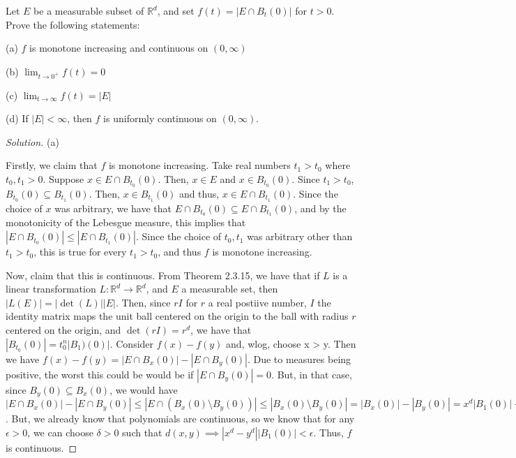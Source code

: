 \documentclass[10pt]{article}
\newenvironment{problem}[2][Problem]{\begin{trivlist}
\item[\hskip \labelsep {\bfseries #1}\hskip \labelsep {\bfseries #2.}]}{\end{trivlist}}
\begin{document}
\begin{problem}{2.3.19}
Let $E$ be a measurable subset of $\mathbb{R}^d$, and set $f(t) = |E \cap B_t(0)|$ for $t > 0$. Prove the following statements:

(a) $f$ is monotone increasing and continuous on $(0,\infty)$

(b) $\lim_{t \rightarrow 0^+} f(t) = 0$

(c) $\lim_{t \rightarrow \infty } f(t) = |E|$

(d) If $|E| < \infty$, then $f$ is uniformly continuous on $(0,\infty)$.
\end{problem}
\begin{proof}[Solution]

(a)

Firstly, we claim that $f$ is monotone increasing. Take real numbers $t_1 > t_0$ where $t_0,t_1 > 0$. Suppose $x \in E \cap B_{t_0}(0)$. Then, $x \in E$ and $x \in B_{t_0}(0)$. Since $t_1 > t_0$, $B_{t_0}(0) \subseteq B_{t_1}(0)$. Then, $x \in  B_{t_1}(0)$ and thus, $x \in E \cap B_{t_1}(0)$. Since the choice of $x$ was arbitrary, we have that $ E \cap B_{t_0}(0) \subseteq  E \cap B_{t_1}(0)$, and by the monotonicity of the Lebesgue measure, this implies that $|E \cap B_{t_0}(0)| \leq  |E \cap B_{t_1}(0)|$. Since the choice of $t_0,t_1$ was arbitrary other than $t_1 > t_0$, this is true for every $t_1 > t_0$, and thus $f$ is monotone increasing.

Now, claim that this is continuous. From Theorem 2.3.15, we have that if $L$ is a linear transformation $L: \mathbb{R}^d \to \mathbb{R}^d$, and $E$ a measurable set, then $|L(E)|  = |\det(L)||E|$. Then, since $rI$ for $r$ a real postiive number, $I$ the identity matrix maps the unit ball centered on the origin to the ball with radius $r$ centered on the origin, and $\det(rI) = r^d$, we have that $|B_{t_0}(0)| = t_0^n|B_{1})(0)|$. Consider $f(x) - f(y)$ and, wlog, choose x > y. Then we have $f(x) - f(y) = |E \cap B_{x}(0)| - |E \cap B_{y}(0)|$. Due to measures being positive, the worst this could be would be if $|E \cap B_{y}(0)| = 0$. But, in that case, since $B_{y}(0) \subseteq B_{x}(0)$, we would have $  |E \cap B_{x}(0)| - |E \cap B_{y}(0)| \leq |E \cap (B_{x}(0) \setminus B_{y}(0))| \leq |B_{x}(0) \setminus B_{y}(0)| = |B_{x}(0)| - |B_{y}(0)| = x^d|B_{1}(0)| - y^d|B_{1}(0)|$. But, we already know that polynomials are continuous, so we know that for any $\epsilon > 0$, we can choose $\delta > 0$ such that $d(x,y) \implies |x^d - y^d||B_{1}(0)| < \epsilon$. Thus, $f$ is continuous.


\end{proof}
\end{document}
